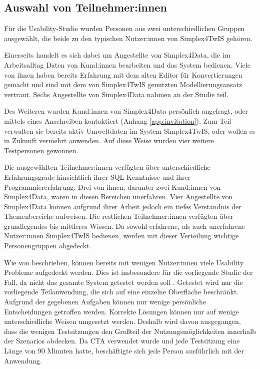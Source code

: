 \subsection{Auswahl von Teilnehmer:innen}

Für die Usability-Studie wurden Personen aus zwei unterschiedlichen Gruppen ausgewählt, die beide zu den typischen Nutzer:innen von Simplex4TwIS gehören.

Einerseits handelt es sich dabei um Angestellte von Simplex4Data, die im Arbeitsalltag Daten von Kund:innen bearbeiten und das System bedienen. Viele von ihnen haben bereits Erfahrung mit dem alten Editor für Konvertierungen gemacht und sind mit dem von Simplex4TwIS genutzten Modellierungsansatz vertraut. Sechs Angestellte von Simplex4Data nahmen an der Studie teil.

Des Weiteren wurden Kund:innen von Simplex4Data persönlich angefragt, oder mittels eines Anschreiben kontaktiert (Anhang \ref{app:invitation}). Zum Teil verwalten sie bereits aktiv Umweltdaten im System Simplex4TwIS, oder wollen es in Zukunft vermehrt anwenden. Auf diese Weise wurden vier weitere Testpersonen gewonnen.

Die ausgewählten Teilnehmer:innen verfügten über unterschiedliche Erfahrungsgrade hinsichtlich ihrer SQL-Kenntnisse und ihrer Programmiererfahrung. Drei von ihnen, darunter zwei Kund:innen von Simplex4Data, waren in diesen Bereichen unerfahren. Vier Angestellte von Simplex4Data können aufgrund ihrer Arbeit jedoch ein tiefes Verständnis der Themenbereiche aufweisen. Die restlichen Teilnehmer:innen verfügten über grundlegendes bis mittleres Wissen. Da sowohl erfahrene, als auch unerfahrene Nutzer:innen Simplex4TwIS bedienen, werden mit dieser Verteilung wichtige Personengruppen abgedeckt.

Wie von \textcite{nielsenWhyYou2000} beschrieben, können bereits mit wenigen Nutzer:innen viele Usability Probleme aufgedeckt werden. Dies ist insbesondere für die vorliegende Studie der Fall, da nicht das gesamte System getestet werden soll \parencite[Vgl. \ref{sec:formative-summative}]{spoolTestingWeb2001}. Getestet wird nur die vorliegende Teilanwendung, die sich auf eine einzelne Oberfläche beschränkt. Aufgrund der gegebenen Aufgaben können nur wenige persönliche Entscheidungen getroffen werden. Korrekte Lösungen können nur auf wenige unterschiedliche Weisen umgesetzt werden. Deshalb wird davon ausgegangen, dass die wenigen Testsitzungen den Großteil der Nutzungsmöglichkeiten innerhalb der Szenarios abdecken. Da \ac{CTA} verwendet wurde und jede Testsitzung eine Länge von 90 Minuten hatte, beschäftigte sich jede Person ausführlich mit der Anwendung.

